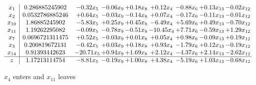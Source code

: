 \documentclass[8pt]{article}
\begin{document}
 \[\begin{array}{c| c c@{\hskip 2pt} c@{\hskip 2pt} c@{\hskip 2pt} c@{\hskip 2pt} c@{\hskip 2pt} c@{\hskip 2pt} c@{\hskip 2pt} }
 x_{1}   &  0.286885245902 & -0.32 x_{5} & -0.06 x_{9} & +  0.18 x_{8} & +  0.12 x_{4} & -0.88 x_{6} & +  0.13 x_{13} & -0.02 x_{12}\\
 x_{2}   &  0.0532786885246 & +  0.64 x_{5} & -0.03 x_{9} & -0.14 x_{8} & +  0.07 x_{4} & -0.17 x_{6} & -0.11 x_{13} & -0.01 x_{12}\\
 x_{10}   &  1.86885245902 & -5.83 x_{5} & +  0.25 x_{9} & +  0.45 x_{8} & -6.49 x_{4} & +  5.69 x_{6} & +  0.49 x_{13} & -0.70 x_{12}\\
 x_{11}   &  1.19262295082 & -0.09 x_{5} & -0.78 x_{9} & -0.51 x_{8} & -10.45 x_{4} & +  7.71 x_{6} & -0.59 x_{13} & +  1.29 x_{12}\\
 x_{7}   &  0.0696721311475 & +  0.52 x_{5} & -0.03 x_{9} & +  0.01 x_{8} & +  0.05 x_{4} & +  0.98 x_{6} & -0.09 x_{13} & +  0.19 x_{12}\\
 x_{3}   &  0.200819672131 & -0.42 x_{5} & +  0.03 x_{9} & +  0.18 x_{8} & +  0.93 x_{4} & -1.79 x_{6} & +  0.12 x_{13} & -0.19 x_{12}\\
 x_{14}   &  0.91393442623 & -20.71 x_{5} & +  0.94 x_{9} & +  1.69 x_{8} & +  2.12 x_{4} & -4.37 x_{6} & +  2.14 x_{13} & -2.62 x_{12}\\
\hline
z    &  1.17213114754 & -8.81 x_{5} & -0.19 x_{9} & +  1.00 x_{8} & +  4.38 x_{4} & -5.19 x_{6} & +  1.03 x_{13} & -0.68 x_{12}\\
\end{array}\]


 $ x_{4} $ enters and $ x_{11} $ leaves 
\end{document}
